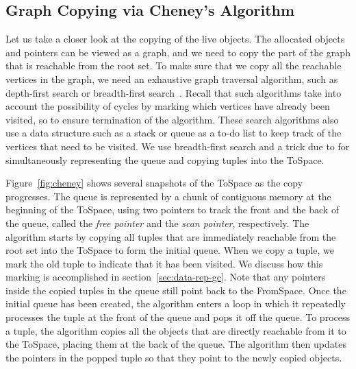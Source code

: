 \documentclass[7x10]{TimesAPriori_MIT}%
\numberwithin{theorem}{chapter}
\numberwithin{definition}{chapter}
\numberwithin{equation}{chapter}
\begin{document}
\subsection{Graph Copying via Cheney's Algorithm}
\label{sec:cheney}
Let us take a closer look at the copying of the live objects. The
allocated objects and pointers can be viewed as a graph, and we need to
copy the part of the graph that is reachable from the root set. To
make sure that we copy all the reachable vertices in the graph, we need
an exhaustive graph traversal algorithm, such as depth-first search or
breadth-first search~\citep{Moore:1959aa,Cormen:2001uq}. Recall that
such algorithms take into account the possibility of cycles by marking
which vertices have already been visited, so to ensure termination
of the algorithm. These search algorithms also use a data structure
such as a stack or queue as a to-do list to keep track of the vertices
that need to be visited. We use breadth-first search and a trick
due to \citet{Cheney:1970aa} for simultaneously representing the queue
and copying tuples into the ToSpace.

Figure~\ref{fig:cheney} shows several snapshots of the ToSpace as the
copy progresses. The queue is represented by a chunk of contiguous
memory at the beginning of the ToSpace, using two pointers to track
the front and the back of the queue, called the \emph{free pointer}
and the \emph{scan pointer}, respectively. The algorithm starts by
copying all tuples that are immediately reachable from the root set
into the ToSpace to form the initial queue.  When we copy a tuple, we
mark the old tuple to indicate that it has been visited. We discuss
how this marking is accomplished in section~\ref{sec:data-rep-gc}. Note
that any pointers inside the copied tuples in the queue still point
back to the FromSpace. Once the initial queue has been created, the
algorithm enters a loop in which it repeatedly processes the tuple at
the front of the queue and pops it off the queue.  To process a tuple,
the algorithm copies all the objects that are directly reachable from it
to the ToSpace, placing them at the back of the queue. The algorithm
then updates the pointers in the popped tuple so that they point to the
newly copied objects.
\end{document}
